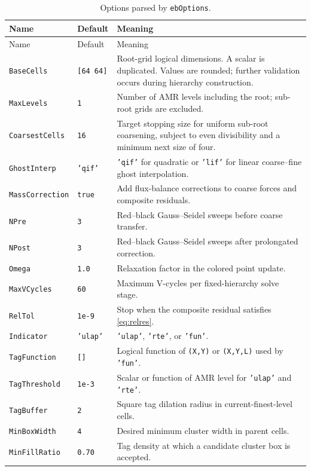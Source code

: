\documentclass[11pt,oneside,openany]{book}
\newcommand{\code}[1]{\textnormal{\texttt{#1}}}
\begin{document}
\small
\begin{longtable}{@{}p{}p{}p{}@{}}
\caption{Options parsed by \code{ebOptions}.}\label{tab:options}\\
\toprule
Name & Default & Meaning \\
\midrule
\endfirsthead
\toprule
Name & Default & Meaning \\
\midrule
\endhead
\code{BaseCells} & \code{[64 64]} & Root-grid logical dimensions. A scalar is duplicated. Values are rounded; further validation occurs during hierarchy construction. \\
\code{MaxLevels} & \code{1} & Number of AMR levels including the root; sub-root grids are excluded. \\
\code{CoarsestCells} & \code{16} & Target stopping size for uniform sub-root coarsening, subject to even divisibility and a minimum next size of four. \\
\code{GhostInterp} & \code{'qif'} & \code{'qif'} for quadratic or \code{'lif'} for linear coarse--fine ghost interpolation. \\
\code{MassCorrection} & \code{true} & Add flux-balance corrections to coarse forces and composite residuals. \\
\code{NPre} & \code{3} & Red--black Gauss--Seidel sweeps before coarse transfer. \\
\code{NPost} & \code{3} & Red--black Gauss--Seidel sweeps after prolongated correction. \\
\code{Omega} & \code{1.0} & Relaxation factor in the colored point update. \\
\code{MaxVCycles} & \code{60} & Maximum V-cycles per fixed-hierarchy solve stage. \\
\code{RelTol} & \code{1e-9} & Stop when the composite residual satisfies \cref{eq:relres}. \\
\code{Indicator} & \code{'ulap'} & \code{'ulap'}, \code{'rte'}, or \code{'fun'}. \\
\code{TagFunction} & \code{[]} & Logical function of \code{(X,Y)} or \code{(X,Y,L)} used by \code{'fun'}. \\
\code{TagThreshold} & \code{1e-3} & Scalar or function of AMR level for \code{'ulap'} and \code{'rte'}. \\
\code{TagBuffer} & \code{2} & Square tag dilation radius in current-finest-level cells. \\
\code{MinBoxWidth} & \code{4} & Desired minimum cluster width in parent cells. \\
\code{MinFillRatio} & \code{0.70} & Tag density at which a candidate cluster box is accepted. \\

\end{longtable}
\end{document}
